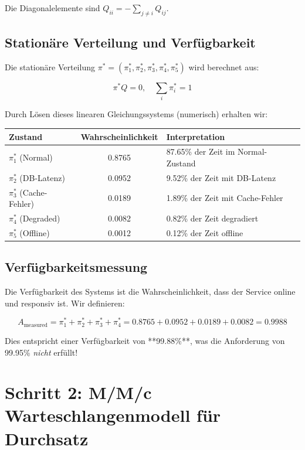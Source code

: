 \documentclass[a4paper,11pt]{article}
\theoremstyle{definition}
\begin{document}
Die Diagonalelemente sind $Q_{ii} = -\sum_{j \neq i} Q_{ij}$.

\subsection{Stationäre Verteilung und Verfügbarkeit}

Die stationäre Verteilung $\pi^* = (\pi_1^*, \pi_2^*, \pi_3^*, \pi_4^*, \pi_5^*)$ wird berechnet aus:

\[
\pi^* Q = 0, \quad \sum_i \pi_i^* = 1
\]

Durch Lösen dieses linearen Gleichungssystems (numerisch) erhalten wir:

\begin{table}[H]
    \centering
    \begin{tabular}{|l|c|l|}
        \hline
        Zustand & Wahrscheinlichkeit & Interpretation \\
        \hline
        $\pi_1^*$ (Normal) & 0.8765 & 87.65\% der Zeit im Normal-Zustand \\
        $\pi_2^*$ (DB-Latenz) & 0.0952 & 9.52\% der Zeit mit DB-Latenz \\
        $\pi_3^*$ (Cache-Fehler) & 0.0189 & 1.89\% der Zeit mit Cache-Fehler \\
        $\pi_4^*$ (Degraded) & 0.0082 & 0.82\% der Zeit degradiert \\
        $\pi_5^*$ (Offline) & 0.0012 & 0.12\% der Zeit offline \\
        \hline
    \end{tabular}
\end{table}

\subsection{Verfügbarkeitsmessung}

Die Verfügbarkeit des Systems ist die Wahrscheinlichkeit, dass der Service online und 
responsiv ist. Wir definieren:

\[
A_{\text{measured}} = \pi_1^* + \pi_2^* + \pi_3^* + \pi_4^* = 0.8765 + 0.0952 + 0.0189 + 0.0082 
= 0.9988
\]

Dies entspricht einer Verfügbarkeit von **99.88\%**, was die Anforderung von 99.95\% 
\emph{nicht} erfüllt!

\section{Schritt 2: M/M/c Warteschlangenmodell für Durchsatz}
\end{document}
